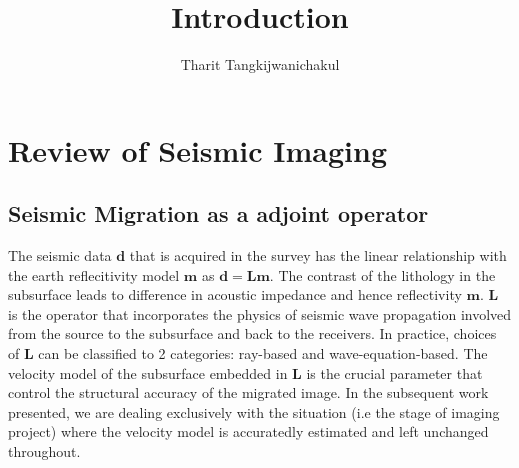 \title{Introduction}
\author{Tharit Tangkijwanichakul}
\label{ch:chapter-intro}
\maketitle
{}

\begin{comment}
Energy companies rely on accurate subsurface images of the Earth's interior in order to make exploration decisions. The image is a final product of acquisition and processing of seismic data, using elastic waves reflected from subsurface structures. The last stage, after the geophysicists estimate essential parameters from the data, is called imaging. At this point, the choice of imaging algorithms is made based primarily on the trade off between the computational cost and the accuracy of the image. The state-of-the-art industry practice is called least-squares imaging and involves the algorithm running iteratively to improve the image quality. However, this practice is computationally expensive and only few iterations are possible because of the large scale of the problem. 

%

As recognized by previous researchers, the algorithm can be accelerated if the inverse Hessian matrix can be accurately approximated. Conventionally, the inverse Hessian is replaced by the identity matrix as an input to algorithms, which is not a correct assumption. This is because it is not practical to form the inverse Hessian explicitly as it involves directly inverting an extremely large matrix.
\end{comment}

\section{Review of Seismic Imaging}

\subsection{Seismic Migration as a adjoint operator}

The seismic data $\mathbf{d}$ that is acquired in the survey has the linear relationship with the earth reflecitivity model $\mathbf{m}$ as $\mathbf{d=Lm}$. The contrast of the lithology in the subsurface leads to difference in acoustic impedance and hence reflectivity $\mathbf{m}$. $\mathbf{L}$ is the operator that incorporates the physics of seismic wave propagation involved from the source to the subsurface and back to the receivers. In practice, choices of $\mathbf{L}$ can be classified to 2 categories: ray-based and wave-equation-based. The velocity model of the subsurface embedded in $\mathbf{L}$ is the crucial parameter that control the structural accuracy of the migrated image. In the subsequent work presented, we are dealing exclusively with the situation (i.e the stage of imaging project) where the velocity model is accuratedly estimated and left unchanged throughout.

